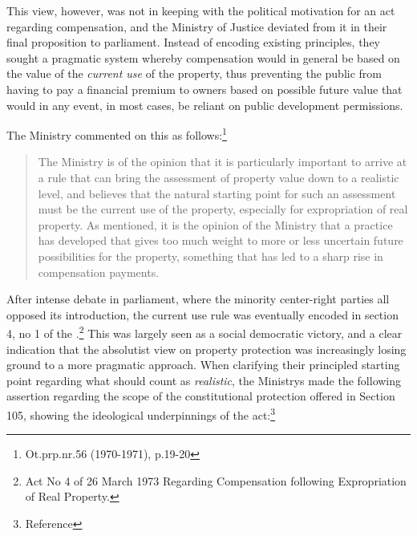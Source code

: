 This view, however, was not in keeping with the political motivation for an act regarding compensation, and the Ministry of Justice deviated from it in their final proposition to parliament. Instead of encoding existing  principles, they sought a pragmatic system whereby compensation would in general be based on the value of the \emph{current use} of the property, thus preventing the public from having to pay a financial premium to owners based on possible future value that would in any event, in most cases, be reliant on public development permissions. %

The Ministry commented on this as follows:\footnote{Ot.prp.nr.56 (1970-1971), p.19-20}

\begin{quote}
The Ministry is of the opinion that it is particularly important to arrive at a rule that can bring the assessment of property value down to a realistic level, and believes that the natural starting point for such an assessment must be the current use of the property, especially for expropriation of real property. As mentioned, it is the opinion of the Ministry that a practice has developed that gives too much weight to more or less uncertain future possibilities for the property, something that has led to a sharp rise in compensation payments.
\end{quote}

After intense debate in parliament, where the minority center-right parties all opposed its introduction, the current use rule was eventually encoded in section 4, no 1 of the \cite{ca73}.\footnote{Act No 4 of 26 March 1973 Regarding Compensation following Expropriation of Real Property.} This was largely seen as a social democratic victory, and a clear indication that the absolutist view on property protection was increasingly losing ground to a more pragmatic approach. When clarifying their principled starting point regarding what should count as \emph{realistic}, the Ministrys made the following assertion regarding the scope of the constitutional protection offered in Section 105, showing the ideological underpinnings of the act:\footnote{Reference}

